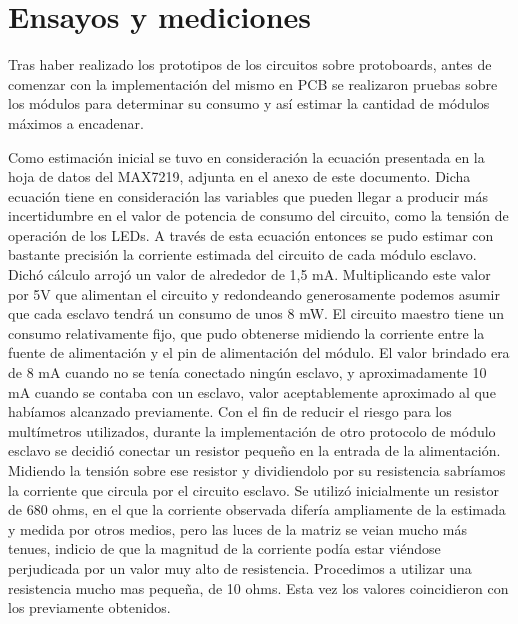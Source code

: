 \clearpage



\clearpage
\part{Ensayos y mediciones}\label{part:ensayos}

Tras haber realizado los prototipos de los circuitos sobre protoboards, antes de comenzar con la implementación del mismo en PCB se realizaron pruebas sobre los módulos para determinar su consumo y así estimar la cantidad de módulos máximos a encadenar.

Como estimación inicial se tuvo en consideración la ecuación presentada en la hoja de datos del MAX7219, adjunta en el anexo de este documento. Dicha ecuación tiene en consideración las variables que pueden llegar a producir más incertidumbre en el valor de potencia de consumo del circuito, como la tensión de operación de los LEDs. A través de esta ecuación entonces se pudo estimar con bastante precisión la corriente estimada del circuito de cada módulo esclavo. Dichó cálculo arrojó un valor de alrededor de 1,5 mA. Multiplicando este valor por 5V que alimentan el circuito y redondeando generosamente podemos asumir que cada esclavo tendrá un consumo de unos 8 mW. El circuito maestro tiene un consumo relativamente fijo, que pudo obtenerse midiendo la corriente entre la fuente de alimentación y el pin de alimentación del módulo. El valor brindado era de 8 mA cuando no se tenía conectado ningún esclavo, y aproximadamente 10 mA cuando se contaba con un esclavo, valor aceptablemente aproximado al que habíamos alcanzado previamente. Con el fin de reducir el riesgo para los multímetros utilizados, durante la implementación de otro protocolo de módulo esclavo se decidió conectar un resistor pequeño en la entrada de la alimentación. Midiendo la tensión sobre ese resistor y dividiendolo por su resistencia sabríamos la corriente que circula por el circuito esclavo. Se utilizó inicialmente un resistor de 680 ohms, en el que la corriente observada difería ampliamente de la estimada y medida por otros medios, pero las luces de la matriz se veian mucho más tenues, indicio de que la magnitud de la corriente podía estar viéndose perjudicada por un valor muy alto de resistencia. Procedimos a utilizar una resistencia mucho mas pequeña, de 10 ohms. Esta vez los valores coincidieron con los previamente obtenidos. 

